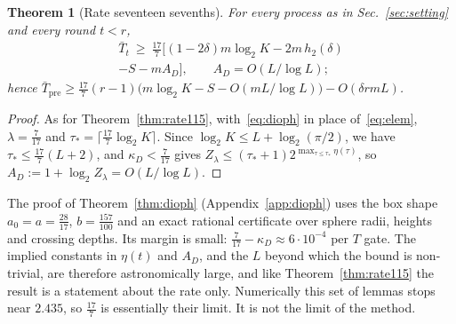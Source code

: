 \documentclass[aps,prx,twocolumn,superscriptaddress,nofootinbib,longbibliography]{revtex4-2}
\theoremstyle{plain}
\newtheorem{theorem}{Theorem}
\theoremstyle{definition}
\theoremstyle{remark}
\newcommand{\Tpre}{T_{\mathrm{pre}}}
\begin{document}
\begin{theorem}[Rate seventeen sevenths]\label{thm:rate177}
For every process as in Sec.~\ref{sec:setting} and every round $t<r$,
\begin{multline}\label{eq:rate177}
\bar T_t\ \ge\ \tfrac{17}7\big[(1-2\delta)m\log_2K-2m\,h_2(\delta)\\-S-mA_D\big],\qquad A_D=O(L/\log L);
\end{multline}
hence $\bar\Tpre\ge\tfrac{17}7(r-1)\big(m\log_2K-S-O(mL/\log L)\big)-O(\delta rmL)$.
\end{theorem}
\begin{proof}
As for Theorem~\ref{thm:rate115}, with~\eqref{eq:dioph} in place of~\eqref{eq:elem}, $\lambda=\tfrac7{17}$ and $\tau_*=\lceil\tfrac{17}7\log_2K\rceil$. Since $\log_2K\le L+\log_2(\pi/2)$, we have $\tau_*\le\tfrac{17}7(L+2)$, and $\kappa_D<\tfrac7{17}$ gives $Z_\lambda\le(\tau_*+1)2^{\max_{\tau\le\tau_*}\eta(\tau)}$, so $A_D:=1+\log_2Z_\lambda=O(L/\log L)$.
\end{proof}
The proof of Theorem~\ref{thm:dioph} (Appendix~\ref{app:dioph}) uses the box shape $a_0=a=\tfrac{28}{17}$, $b=\tfrac{157}{100}$ and an exact rational certificate over sphere radii, heights and crossing depths. Its margin is small: $\tfrac7{17}-\kappa_D\approx6\cdot10^{-4}$ per $T$ gate. The implied constants in $\eta(t)$ and $A_D$, and the $L$ beyond which the bound is non-trivial, are therefore astronomically large, and like Theorem~\ref{thm:rate115} the result is a statement about the rate only. Numerically this set of lemmas stops near $2.435$, so $\tfrac{17}7$ is essentially their limit. It is not the limit of the method.
\end{document}
